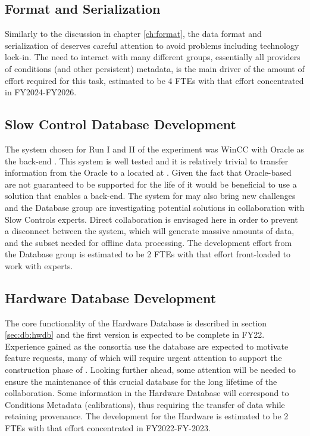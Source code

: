 \documentclass[../main-v1.tex]{subfiles}
\begin{document}
\subsection{ Format and Serialization}

Similarly to the discussion in chapter \ref{ch:format}, the data format and serialization of  deserves careful attention to avoid problems including technology lock-in.  The need to interact with many different groups, essentially all providers of conditions (and other persistent) metadata, is the main driver of the amount of effort required for this task, estimated to be 4 FTEs with that effort concentrated in FY2024-FY2026.

\subsection{Slow Control Database Development}

The   system chosen for Run I and II of the  experiment was WinCC with Oracle as the back-end . This system is well tested and it is relatively trivial to transfer information from the Oracle  to a   located at . Given the fact that Oracle-based  are not guaranteed to be supported for the life of  it would be beneficial to use a solution that enables a  back-end.  The  system for  may also bring new challenges and the Database group are investigating potential solutions in collaboration with Slow Controls experts. Direct collaboration is envisaged here in order to prevent a disconnect between the  system, which will generate massive amounts of data, and the subset needed for offline data processing.  The development effort from the Database group is estimated to be 2 FTEs with that effort front-loaded to work with   experts.


\subsection{Hardware Database Development}

The core functionality of the Hardware Database is described in section \ref{sec:db:hwdb} and the first version is expected to be complete in FY22.  Experience gained as the consortia use the database are expected to motivate feature requests, many of which will require urgent attention to support the construction phase of .  Looking further ahead, some attention will be needed to ensure the maintenance of this crucial database for the long lifetime of the collaboration.  Some information in the Hardware Database will correspond to Conditions Metadata (calibrations), thus requiring the transfer of data while retaining provenance. The development for the Hardware  is estimated to be 2 FTEs with that effort concentrated in FY2022-FY-2023.
\end{document}
